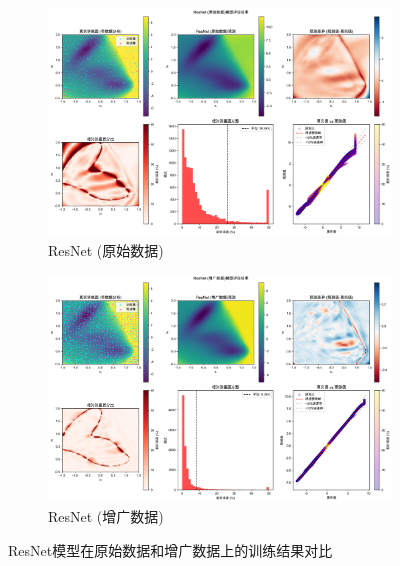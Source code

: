 \documentclass[11pt]{article}
\begin{document}
\begin{figure}[htbp]
    \centering
    \begin{subfigure}[b]{0.8\textwidth}
        \centering
        \includegraphics[width=\textwidth]{results_20250330_150206/figures/ResNet_round1_评估结果.png}
        \caption{ResNet (原始数据)}
        \label{fig:resnet_round1}
    \end{subfigure}

    \vspace{0.5cm}
    \begin{subfigure}[b]{0.8\textwidth}
        \centering
        \includegraphics[width=\textwidth]{results_20250330_150206/figures/ResNet_round2_评估结果.png}
        \caption{ResNet (增广数据)}
        \label{fig:resnet_round2}
    \end{subfigure}
    \caption{ResNet模型在原始数据和增广数据上的训练结果对比}
    \label{fig:resnet_results}
\end{figure}
\end{document}
